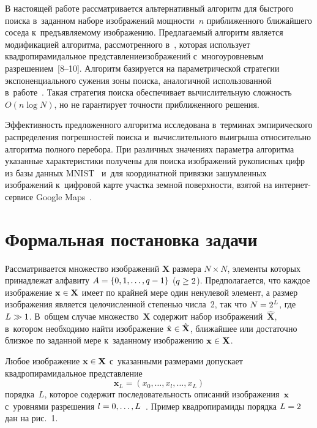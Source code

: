 \begin{multicols}{2}
  В настоящей работе рассматривается альтернативный алгоритм для быстрого 
поиска в~заданном наборе изображений мощ\-ности~$n$ приближенного 
ближайшего соседа к~предъявляемому изображению. Предлагаемый алгоритм 
является модификацией алгоритма, рассмотренного в~\cite{7-lan}, которая 
использует квадропирамидальное представление\linebreak изобра\-жений 
с~многоуровневым разрешением~[8--10]. Алгоритм базируется на 
параметрической стратегии экспоненциального сужения зоны поиска, 
аналогичной использованной в~работе~\cite{11-lan}. Такая стратегия поиска 
обеспечивает вычислительную сложность $O(n\log N)$, но не гарантирует 
точности приближенного решения.
  
  Эффективность предложенного алгоритма исследована в~терминах 
эмпирического распределения погрешностей поиска и~вычислительного 
выигры\-ша относительно алгоритма полного перебора. При различных 
значениях параметра алгоритма указанные характеристики получены для 
поиска изображений рукописных цифр из базы данных MNIST~\cite{12-lan} 
и~для координатной привязки зашумленных изображений к~цифровой карте 
участка земной поверхности, взятой на ин\-тер\-нет-сер\-ви\-се Google 
Maps~\cite{13-lan}. 
  
  \section{Формальная постановка задачи}
  
  Рассматривается множество изображений $\mathbf{X}$ размера $N\times N$, 
элементы которых принадлежат алфавиту $A\hm=\{0,1,\ldots ,q-1\}$ ($q\hm\geq 
2$). Предполагается, что каждое изображение $\mathbf{x}\hm\in\mathbf{X}$ 
имеет по крайней мере один ненулевой элемент, а размер изображения является 
целочисленной степенью числа~2, так что $N\hm=2^L$, где $L\hm\gg1$. 
В~общем случае мно\-же\-ст\-во~$\mathbf{X}$ содержит набор 
изображений~$\hat{\mathbf{X}}$, в~котором необходимо найти изображение 
$\hat{\mathbf{x}}\hm\in\hat{\mathbf{X}}$, ближайшее или достаточно близкое по 
заданной мере к~заданному изображению $\mathbf{x}\hm\in\mathbf{X}$.
  
  Любое изображение $\mathbf{x}\hm\in\mathbf{X}$ с~указанными размерами 
допускает квадропирамидальное пред\-став\-ление 
  \begin{equation}
  \mathbf{x}_L=\left( x_0, \ldots , x_l, \ldots , x_L\right)
  \label{e1-lan}
  \end{equation}
порядка~$L$, которое содержит последовательность описаний 
изображения~$\mathbf{x}$ с~уровнями разрешения $l\hm=0,\ldots , 
L$~\cite{8-lan}. Пример квадропирамиды порядка $L\hm=2$ дан на рис.~1.




\end{multicols}
